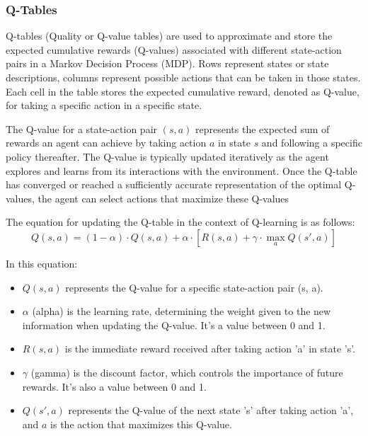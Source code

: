 \subsubsection{Q-Tables}

Q-tables (Quality or Q-value tables) are used to approximate and store the expected cumulative rewards (Q-values) associated 
with different state-action pairs in a Markov Decision Process (MDP).
Rows represent states or state descriptions, columns represent possible actions that can be taken in those states.
Each cell in the table stores the expected cumulative reward, denoted as Q-value, for taking a specific action in a specific state.

The Q-value for a state-action pair $(s, a)$ represents the expected sum of rewards an agent can achieve by taking 
action $a$ in state $s$ and following a specific policy thereafter. The Q-value is typically updated iteratively as the 
agent explores and learns from its interactions with the environment.
Once the Q-table has converged or reached a sufficiently accurate representation of the optimal Q-values, 
the agent can select actions that maximize these Q-values

The equation for updating the Q-table in the context of Q-learning is as follows:
\begin{equation} \label{eq:1}
Q(s, a) = (1 - \alpha) \cdot Q(s, a) + \alpha \cdot [R(s, a) + \gamma \cdot \max_a Q(s', a)]
\end{equation}

In this equation:

\begin{itemize}

\item $Q(s, a)$ represents the Q-value for a specific state-action pair (s, a).
\item $\alpha$ (alpha) is the learning rate, determining the weight given to the new information when updating the Q-value. It's a value between 0 and 1.
\item $R(s, a)$ is the immediate reward received after taking action 'a' in state 's'.
\item $\gamma$ (gamma) is the discount factor, which controls the importance of future rewards. It's also a value between 0 and 1.
\item $Q(s', a)$ represents the Q-value of the next state 's' after taking action 'a', and \(a\) is the action that maximizes this Q-value.

\end{itemize}

